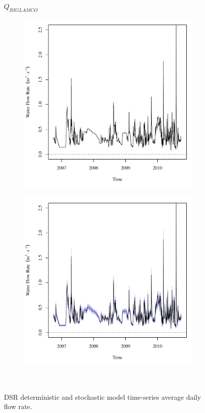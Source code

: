 \subfiguremid
\begin{landscape}
	\begin{figure}
		\centering
		$ Q_{BIGLAMCO} $
		\begin{subfigure}{0.7\textwidth}
			\centering
			\includegraphics[width=\tableCustomSize]{"Figures/Results_DSR/Deterministic/Q BIG"}
		\end{subfigure}%
		\begin{subfigure}{0.7\textwidth}
			\centering
			\includegraphics[width=\tableCustomSize]{"Figures/Results_DSR/Stochastic/Q BIG"}
		\end{subfigure}\\
		\caption{DSR deterministic and stochastic model time-series average daily flow rate.}
	\end{figure}
\end{landscape}
